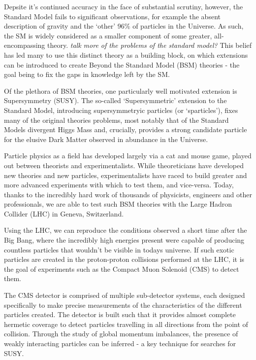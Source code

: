Depsite it's continued accuracy in the face of substantial scrutiny, however,
the Standard Model fails to significant observations, for example
the absent description of gravity and the `other' 96\% of particles in the
Universe. As such, the SM is widely considered as a smaller component of some
greater, all-encompassing theory.
\emph{talk more of the problems of the standard model?}
This belief has led many to use this distinct theory as a building
block, on which extensions can be introduced to create Beyond the Standard Model
(BSM) theories - the goal being to fix the gaps in knowledge left by the SM.

Of the plethora of BSM theories, one particularly well motivated extension is
Supersymmetry (SUSY). The so-called `Supersymmetric' extension to the Standard
Model, introducing supersymmetryic particles (or `sparticles'), fixes many of
the original theories problems, most notably that of the
Standard Models divergent Higgs Mass and, crucially, provides a strong
candidate particle for the elusive Dark Matter observed in abundance in the
Universe.

Particle physics as a field has developed largely via a cat and mouse game,
played out between theorists and experimentalists. While theoreticians have
developed new theories and new particles, experimentalists have raced to build
greater and more advanced experiments with which to test them, and vice-versa.
Today, thanks to the incredibly hard work of thousands of physicists, engineers
and other professionals, we are able to test such BSM theories with the Large
Hadron Collider (LHC) in Geneva, Switzerland.

Using the LHC, we can reproduce the conditions observed a short time
after the Big Bang, where the incredibly high energies present were capable of
producing countless particles that wouldn't be visible in todays universe. If
such exotic particles are created in the proton-proton collisions performed at
the LHC, it is the goal of experiments such as the Compact Muon Solenoid (CMS)
to detect them.

The CMS detector is comprised of multiple sub-detector systems, each designed
specifically to make precise measurements of the characteristics of the
different particles created. The detector is built such that it provides almost
complete hermetic coverage to detect particles travelling in all directions
from the point of collision. Through the study of global momentum imbalances,
the presence of weakly interacting particles can be inferred - a key technique
for searches for SUSY.

